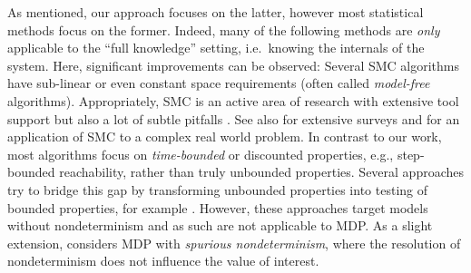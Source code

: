\documentclass{theoretics}
\begin{document}
As mentioned, our approach focuses on the latter, however most statistical methods focus on the former.
Indeed, many of the following methods are \emph{only} applicable to the \enquote{full knowledge} setting, i.e.\ knowing the internals of the system.
Here, significant improvements can be observed:
Several SMC algorithms have sub-linear or even constant space requirements (often called \emph{model-free} algorithms).
Appropriately, SMC is an active area of research with extensive tool support \cite{DBLP:conf/tacas/JegourelLS12,DBLP:conf/mmb/BogdollHH12,DBLP:conf/qest/BoyerCLS13,DBLP:journals/corr/abs-1207-1272,DBLP:conf/cav/DavidLLMW11,DBLP:conf/cav/Younes05a,DBLP:conf/qest/SenVA05,wats} but also a lot of subtle pitfalls \cite{DBLP:journals/sigmobile/KurkowskiCC05}.
See also \cite{DBLP:conf/isola/Kretinsky16,DBLP:journals/tomacs/AghaP18,DBLP:series/lncs/LegayLTYSG19} for extensive surveys and \cite{DBLP:conf/hybrid/RoohiW0D017} for an application of SMC to a complex real world problem.
In contrast to our work, most algorithms focus on \emph{time-bounded} or discounted properties, e.g., step-bounded reachability, rather than truly unbounded properties.
Several approaches try to bridge this gap by transforming unbounded properties into testing of bounded properties, for example \cite{DBLP:conf/sbmf/YounesCZ10,DBLP:conf/kbse/HeJBGW10,DBLP:conf/atva/RabihP09,DBLP:conf/cav/SenVA05}.
However, these approaches target models without nondeterminism and as such are not applicable to MDP.
As a slight extension, \cite{DBLP:conf/forte/BogdollFHH11} considers MDP with \emph{spurious nondeterminism}, where the resolution of nondeterminism does not influence the value of interest.
\end{document}
